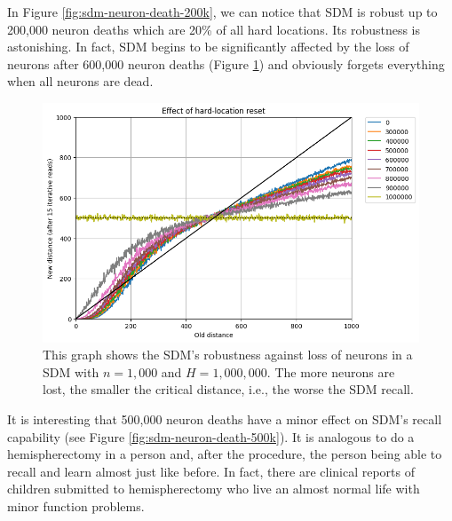 In Figure \ref{fig:sdm-neuron-death-200k}, we can notice that SDM is robust up to 200,000 neuron deaths which are 20\% of all hard locations. Its robustness is astonishing.  In fact, SDM begins to be significantly affected by the loss of neurons after 600,000 neuron deaths (Figure \ref{fig:sdm-neuron-death-1m}) and obviously forgets everything when all neurons are dead.

\begin{figure}[!p]
\centering\includegraphics[width=\textwidth]{./images02/new-images/sdm-neuron-death-1m.png}
\caption{This graph shows the SDM's robustness against loss of neurons in a SDM with $n=1,000$ and $H=1,000,000$. The more neurons are lost, the smaller the critical distance, i.e., the worse the SDM recall.
\label{fig:sdm-neuron-death-1m}}
\end{figure}

It is interesting that 500,000 neuron deaths have a minor effect on SDM's recall capability (see Figure \ref{fig:sdm-neuron-death-500k}). It is analogous to do a hemispherectomy in a person and, after the procedure, the person being able to recall and learn almost just like before. In fact, there are clinical reports of children submitted to hemispherectomy who live an almost normal life with minor function problems.

